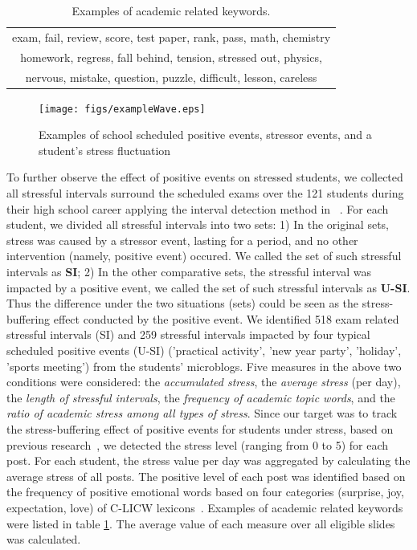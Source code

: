 \begin{table}[h]
\centering
\caption{\small{Examples of academic related keywords.}}
\label{tab:studyWords}
\small{
\begin{tabular}{c}
\toprule
exam, fail, review, score, test paper, rank, pass, math, chemistry\\
homework, regress, fall behind, tension, stressed out, physics,\\
nervous, mistake, question, puzzle, difficult, lesson, careless\\
\bottomrule
\end{tabular}
}
\end{table}


\begin{figure}[H]
\centering
\texttt{[image: figs/exampleWave.eps]}
\caption{\small{Examples of school scheduled positive events, stressor events, and a student's stress fluctuation}}
\label{fig:example}
\end{figure}

To further observe the effect of positive events on stressed students,
we collected all stressful intervals surround the scheduled exams over the 121 students during their high school career
applying the interval detection method in ~\citep{Li2017Analyzing}.
For each student, we divided all stressful intervals into two sets:
1) In the original sets, stress was caused by a stressor event, lasting for a period,
and no other intervention (namely, positive event) occured.
We called the set of such stressful intervals as \textbf{SI};
2) In the other comparative sets,
the stressful interval was impacted by a positive event,
we called the set of such stressful intervals as \textbf{U-SI}.
Thus the difference under the two situations (sets) could be seen as the stress-buffering effect
conducted by the positive event.
We identified 518 exam related stressful intervals (SI)
and 259 stressful intervals impacted by four typical scheduled positive events (U-SI)
('practical activity', 'new year party', 'holiday', 'sports meeting') from the students' microblogs.
Five measures in the above two conditions were considered:
the \emph{accumulated stress}, the \emph{average stress} (per day), the \emph{length of stressful intervals},
the \emph{frequency of academic topic words}, and the \emph{ratio of academic stress among all types of stress}.
Since our target was to track the stress-buffering effect of positive events for students under stress,
based on previous research~\cite{XueUbicomp13},
we detected the stress level (ranging from 0 to 5) for each post.
For each student,
the stress value per day was aggregated by calculating the average stress of all posts.
The positive level of each post was identified based on the frequency of positive emotional words
based on four categories (surprise, joy, expectation, love) of C-LICW lexicons~\citep{Tausczik2010The}.
Examples of academic related keywords were listed in table \ref{tab:studyWords}.
The average value of each measure over all eligible slides was calculated.


